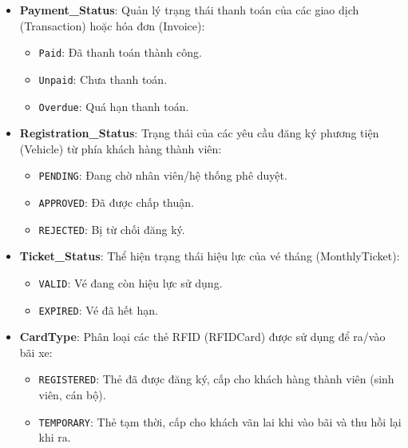 \begin{itemize}
    \item \textbf{Payment\_Status}: Quản lý trạng thái thanh toán của các giao dịch (Transaction) hoặc hóa đơn (Invoice):
    \begin{itemize}
        \item \texttt{Paid}: Đã thanh toán thành công.
        \item \texttt{Unpaid}: Chưa thanh toán.
        \item \texttt{Overdue}: Quá hạn thanh toán.
    \end{itemize}

    \item \textbf{Registration\_Status}: Trạng thái của các yêu cầu đăng ký phương tiện (Vehicle) từ phía khách hàng thành viên:
    \begin{itemize}
        \item \texttt{PENDING}: Đang chờ nhân viên/hệ thống phê duyệt.
        \item \texttt{APPROVED}: Đã được chấp thuận.
        \item \texttt{REJECTED}: Bị từ chối đăng ký.
    \end{itemize}

    \item \textbf{Ticket\_Status}: Thể hiện trạng thái hiệu lực của vé tháng (MonthlyTicket):
    \begin{itemize}
        \item \texttt{VALID}: Vé đang còn hiệu lực sử dụng.
        \item \texttt{EXPIRED}: Vé đã hết hạn.
    \end{itemize}

    \item \textbf{CardType}: Phân loại các thẻ RFID (RFIDCard) được sử dụng để ra/vào bãi xe:
    \begin{itemize}
        \item \texttt{REGISTERED}: Thẻ đã được đăng ký, cấp cho khách hàng thành viên (sinh viên, cán bộ).
        \item \texttt{TEMPORARY}: Thẻ tạm thời, cấp cho khách vãn lai khi vào bãi và thu hồi lại khi ra.
    \end{itemize}
\end{itemize}



